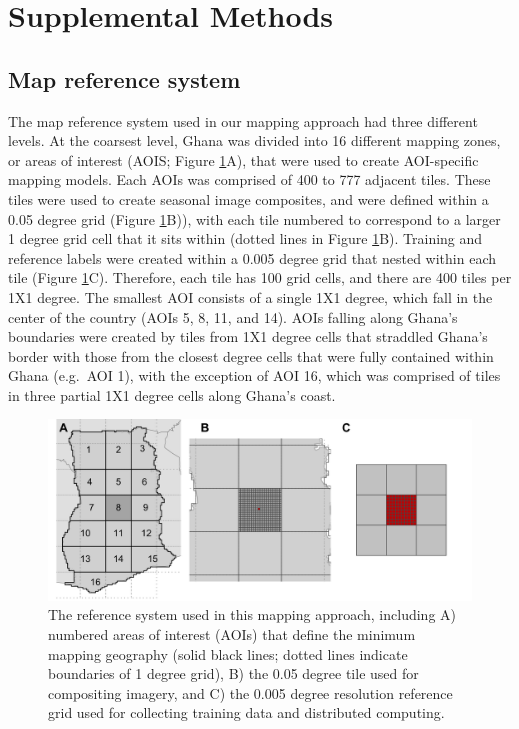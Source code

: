 \documentclass[
  11pt,
  a4paper]{article}
\begin{document}
\hypertarget{supplemental-methods}{%
\section{Supplemental Methods}\label{supplemental-methods}}

\hypertarget{map-reference-system}{%
\subsection{Map reference system}\label{map-reference-system}}

The map reference system used in our mapping approach had three
different levels. At the coarsest level, Ghana was divided into 16
different mapping zones, or areas of interest (AOIS; Figure
\ref{fig:aois}A), that were used to create AOI-specific mapping models.
Each AOIs was comprised of 400 to 777 adjacent tiles. These tiles were
used to create seasonal image composites, and were defined within a 0.05
degree grid (Figure \ref{fig:aois}B)), with each tile numbered to
correspond to a larger 1 degree grid cell that it sits within (dotted
lines in Figure \ref{fig:aois}B). Training and reference labels were
created within a 0.005 degree grid that nested within each tile (Figure
\ref{fig:aois}C). Therefore, each tile has 100 grid cells, and there are
400 tiles per 1X1 degree. The smallest AOI consists of a single 1X1
degree, which fall in the center of the country (AOIs 5, 8, 11, and 14).
AOIs falling along Ghana's boundaries were created by tiles from 1X1
degree cells that straddled Ghana's border with those from the closest
degree cells that were fully contained within Ghana (e.g.~AOI 1), with
the exception of AOI 16, which was comprised of tiles in three partial
1X1 degree cells along Ghana's coast.

\begin{figure}[!ht]

{\centering \includegraphics[width=1\linewidth,]{figures/reference_system} 

}

\caption{The reference system used in this mapping approach, including A) numbered areas of interest (AOIs) that define the minimum mapping geography (solid black lines; dotted lines indicate boundaries of 1 degree grid), B) the 0.05 degree tile used for compositing imagery, and C) the 0.005 degree resolution reference grid used for collecting training data and distributed computing.}\label{fig:aois}
\end{figure}
\end{document}

